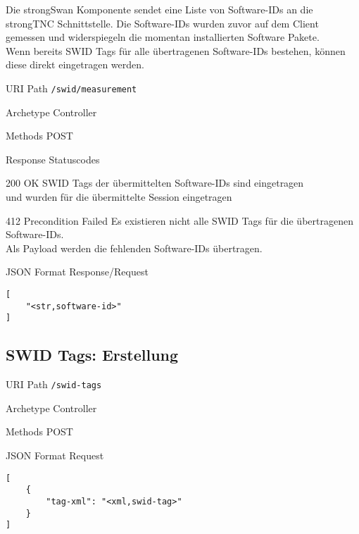 \documentclass[10pt,a4paper]{scrartcl}
\begin{document}
Die strongSwan Komponente sendet eine Liste von Software-IDs an die strongTNC 
Schnittstelle. Die Software-IDs wurden zuvor auf dem Client gemessen und widerspiegeln die momentan
installierten Software Pakete.\\
Wenn bereits SWID Tags für alle übertragenen Software-IDs bestehen, können diese direkt eingetragen werden.
\begin{mdframed}[style=def]
\begin{description*}
	\item[URI Path] \texttt{/swid/measurement}
	\item[Archetype] Controller
	\item[Methods] POST
	\item[Response Statuscodes] \hfill
		\begin{description*}
			\item[200 OK] SWID Tags der übermittelten Software-IDs sind eingetragen \\
			und wurden für die übermittelte Session eingetragen
			\item[412 Precondition Failed] Es existieren nicht alle SWID Tags für die übertragenen Software-IDs.\\
			Als Payload werden die fehlenden Software-IDs übertragen.
		\end{description*}
	\item[JSON Format Response/Request] \hfill
\begin{lstlisting}
[
	"<str,software-id>"
]
\end{lstlisting}
\end{description*}
\end{mdframed}

\pagebreak
\subsection{SWID Tags: Erstellung}

\begin{mdframed}[style=def]
\begin{description*}
	\item[URI Path] \texttt{/swid-tags}
	\item[Archetype] Controller
	\item[Methods] POST
	\item[JSON Format Request] \hfill
\begin{lstlisting}
[
	{
        "tag-xml": "<xml,swid-tag>"	
	}
]
\end{lstlisting}
\end{description*}
\end{mdframed}
\end{document}
